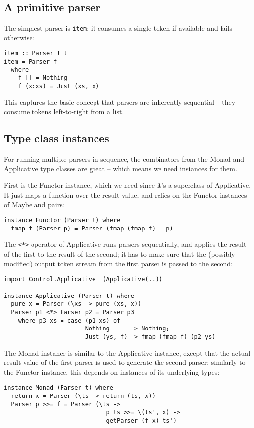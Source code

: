 \documentclass{tmr}
\begin{document}
\subsection{A primitive parser}
The simplest parser is \verb+item+; it 
consumes a single token if available and fails otherwise:
\begin{verbatim}
item :: Parser t t
item = Parser f
  where 
    f [] = Nothing
    f (x:xs) = Just (xs, x)
\end{verbatim}

This captures the basic concept that parsers are inherently sequential --
they consume tokens left-to-right from a list.


\subsection{Type class instances}
For running multiple parsers in sequence, the combinators from the Monad and
Applicative type classes are great -- which means we need instances for
them.

First is the Functor instance, which we need since it's a superclass
of Applicative.  It just maps a function over the result value, and
relies on the Functor instances of Maybe and pairs:
\begin{verbatim}
instance Functor (Parser t) where
  fmap f (Parser p) = Parser (fmap (fmap f) . p)
\end{verbatim}

The \verb+<*>+ operator of Applicative runs parsers sequentially, 
and applies the result of the first to the result of the second; it
has to make sure that the (possibly modified) output token stream from
the first parser is passed to the second:
\begin{verbatim}  
import Control.Applicative  (Applicative(..))

instance Applicative (Parser t) where
  pure x = Parser (\xs -> pure (xs, x))
  Parser p1 <*> Parser p2 = Parser p3
    where p3 xs = case (p1 xs) of
                       Nothing      -> Nothing;
                       Just (ys, f) -> fmap (fmap f) (p2 ys)
\end{verbatim}

The Monad instance is similar to the Applicative instance, except that 
the actual result value of the first parser is used to generate the 
second parser; similarly to the Functor instance, this depends on 
instances of its underlying types:
\begin{verbatim}
instance Monad (Parser t) where
  return x = Parser (\ts -> return (ts, x))
  Parser p >>= f = Parser (\ts ->
                             p ts >>= \(ts', x) ->
                             getParser (f x) ts')
\end{verbatim}
\end{document}
